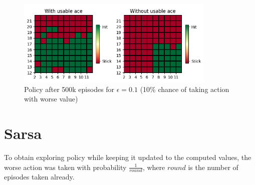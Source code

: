 \documentclass{article}
\begin{document}
    \begin{figure}[h]
        \centering
        \includegraphics[width=9.5cm]{plots/mcopfv_policy_500k.png}
        \caption{Policy after 500k episodes for $\epsilon=0.1$ (10\% chance of taking action with worse value)}
    \end{figure}


    \section{Sarsa}
    To obtain exploring policy while keeping it updated to the computed values, the worse action was taken with probability $\frac{1}{round}$, where $round$ is the number of episodes taken already.
\end{document}

